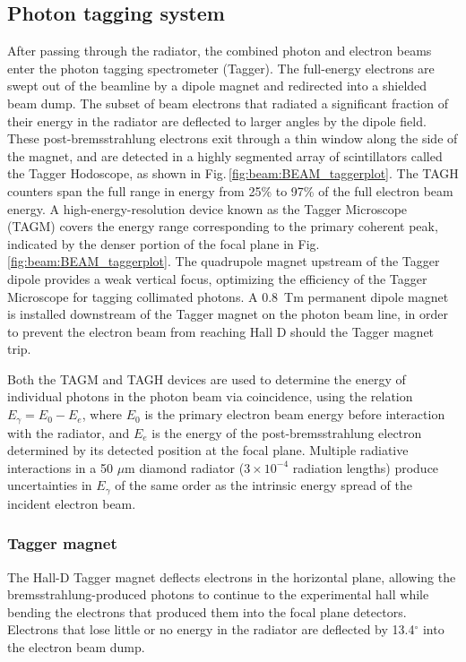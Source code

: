 \subsection{Photon tagging system \label{sec:tag}}
After passing through the radiator, the combined photon and electron beams enter
the photon tagging spectrometer (Tagger). The full-energy electrons are swept out of
the beamline by a dipole magnet and redirected into a shielded beam dump. The
subset of beam electrons that radiated a significant fraction of their energy in
the radiator are deflected to larger angles by the dipole field. 
These post-brems\-strah\-lung electrons exit through a thin window
along the side of the magnet, and are detected in a highly segmented
array of scintillators called the Tagger Hodoscope, as shown in
Fig.\,\ref{fig:beam:BEAM_taggerplot}. The TAGH counters span
the full range in energy from 25\% to 97\% of the full electron beam energy. A high-energy-resolution device known as the Tagger Microscope (TAGM) covers the
energy range corresponding to the primary coherent peak, indicated by the denser
portion of the focal plane in Fig.\,\ref{fig:beam:BEAM_taggerplot}. 
The quadrupole magnet upstream of the Tagger dipole provides a weak vertical focus, optimizing the efficiency of the Tagger Microscope for tagging collimated photons.
A 0.8~Tm permanent dipole magnet is installed downstream of the Tagger magnet on the photon beam line, in order to prevent the electron beam from reaching Hall D should the Tagger magnet trip.

Both the TAGM and TAGH devices are used to determine the energy of individual
photons in the photon beam via coincidence, using
the relation $E_{\gamma} = E_{0} - E_{e}$, where $E_{0}$ is the primary electron
beam energy before interaction with the radiator, and $E_{e}$ is the
energy of the post-brems\-strah\-lung electron determined by its detected position at the
focal plane. Multiple radiative interactions in a 50 $\mu$m diamond radiator
($3\times 10^{-4}$ radiation lengths) produce uncertainties in
$E_{\gamma}$ of the same order as the intrinsic energy spread of the incident
electron beam.

\subsubsection{Tagger magnet \label{sec:tagMagnet}}
The Hall-D Tagger magnet deflects electrons in the horizontal plane, allowing the
brems\-strah\-lung-produced photons to continue to the experimental hall while
bending the electrons that produced them into the focal plane detectors.
Electrons that lose little or no energy in the
radiator are deflected by 13.4$^\circ$ into the electron beam dump.

